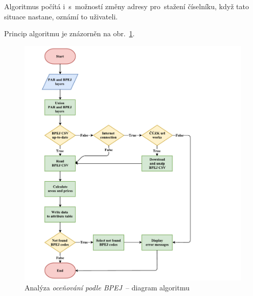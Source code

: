Algoritmus počítá i~s~možností změny adresy pro~stažení číselníku,
když tato situace nastane, oznámí to uživateli.

Princip algoritmu je znázorněn na obr.~\ref{fig:diagram_bpej}.

	\begin{figure}[H] %
		\includegraphics[width=1.2\textwidth]{./pictures/bpej.pdf}
		\caption[Analýza \textit{oceňování podle BPEJ}~–
diagram algoritmu]{Analýza \textit{oceňování podle BPEJ}~– diagram
algoritmu}
		\label{fig:diagram_bpej}
 	\end{figure}
